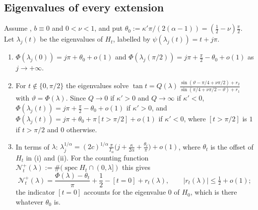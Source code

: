 \subsection{Eigenvalues of every extension}

\begin{corollary}\label{cor:dimer}
Assume , $b\equiv0$ and $0<\nu<1$, and put
$\theta_0:=\kappa'\pi/(2(\alpha-1))=(\frac12-\nu)\frac\pi2$. Let $\lambda_j(t)$ be the
eigenvalues of $H_t$, labelled by $\psi(\lambda_j(t))=t+j\pi$.
\begin{enumerate}
\item[(i)] $\Phi(\lambda_j(0))=j\pi+\theta_0+o(1)$ and
  $\Phi(\lambda_j(\pi/2))=j\pi+\frac\pi2-\theta_0+o(1)$ as $j\to+\infty$.
\item[(ii)] For $t\notin\{0,\pi/2\}$ the eigenvalues solve
  $\tan t=Q(\lambda)\,\frac{\sin(\vartheta-\pi/4+\nu\pi/2)+r_2}{\sin(\pi/4+\nu\pi/2-\vartheta)+r_1}$ with
  $\vartheta=\Phi(\lambda)$. Since $Q\to0$ if $\kappa'>0$ and $Q\to\infty$ if $\kappa'<0$,
  $\Phi(\lambda_j(t))=j\pi+\frac\pi2-\theta_0+o(1)$ if $\kappa'>0$, and
  $\Phi(\lambda_j(t))=j\pi+\theta_0+\pi[t>\pi/2]+o(1)$ if $\kappa'<0$, where $[t>\pi/2]$ is $1$ if
  $t>\pi/2$ and $0$ otherwise.
\item[(iii)] In terms of $\lambda$:
  $\lambda_j^{1/\alpha}=(2c)^{1/\alpha}\frac\pi{I_\alpha}\bigl(j+\frac\kappa{2\alpha}+\frac{\theta_t}{\pi}\bigr)+o(1)$,
  where $\theta_t$ is the offset of $H_t$ in (i) and (ii). For the counting function
  $\mathcal N^+_t(\lambda):=\#(\operatorname{spec}H_t\cap(0,\lambda])$ this gives
  \[
    \mathcal N^+_t(\lambda)=\frac{\Phi(\lambda)-\theta_t}{\pi}+\frac12-[t=0]+r_t(\lambda),\qquad|r_t(\lambda)|\le\tfrac12+o(1);
  \]
  the indicator $[t=0]$ accounts for the eigenvalue $0$ of $H_0$, which is there whatever $\theta_0$ is.
\end{enumerate}
\end{corollary}

